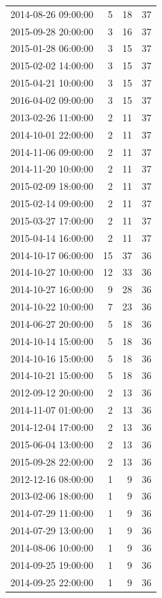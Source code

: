 \begin{tabular}{lrrr}
2014-08-26 09:00:00 & 5 & 18 & 37 \\
2015-09-28 20:00:00 & 3 & 16 & 37 \\
2015-01-28 06:00:00 & 3 & 15 & 37 \\
2015-02-02 14:00:00 & 3 & 15 & 37 \\
2015-04-21 10:00:00 & 3 & 15 & 37 \\
2016-04-02 09:00:00 & 3 & 15 & 37 \\
2013-02-26 11:00:00 & 2 & 11 & 37 \\
2014-10-01 22:00:00 & 2 & 11 & 37 \\
2014-11-06 09:00:00 & 2 & 11 & 37 \\
2014-11-20 10:00:00 & 2 & 11 & 37 \\
2015-02-09 18:00:00 & 2 & 11 & 37 \\
2015-02-14 09:00:00 & 2 & 11 & 37 \\
2015-03-27 17:00:00 & 2 & 11 & 37 \\
2015-04-14 16:00:00 & 2 & 11 & 37 \\
2014-10-17 06:00:00 & 15 & 37 & 36 \\
2014-10-27 10:00:00 & 12 & 33 & 36 \\
2014-10-27 16:00:00 & 9 & 28 & 36 \\
2014-10-22 10:00:00 & 7 & 23 & 36 \\
2014-06-27 20:00:00 & 5 & 18 & 36 \\
2014-10-14 15:00:00 & 5 & 18 & 36 \\
2014-10-16 15:00:00 & 5 & 18 & 36 \\
2014-10-21 15:00:00 & 5 & 18 & 36 \\
2012-09-12 20:00:00 & 2 & 13 & 36 \\
2014-11-07 01:00:00 & 2 & 13 & 36 \\
2014-12-04 17:00:00 & 2 & 13 & 36 \\
2015-06-04 13:00:00 & 2 & 13 & 36 \\
2015-09-28 22:00:00 & 2 & 13 & 36 \\
2012-12-16 08:00:00 & 1 & 9 & 36 \\
2013-02-06 18:00:00 & 1 & 9 & 36 \\
2014-07-29 11:00:00 & 1 & 9 & 36 \\
2014-07-29 13:00:00 & 1 & 9 & 36 \\
2014-08-06 10:00:00 & 1 & 9 & 36 \\
2014-09-25 19:00:00 & 1 & 9 & 36 \\
2014-09-25 22:00:00 & 1 & 9 & 36 \\

\end{tabular}
